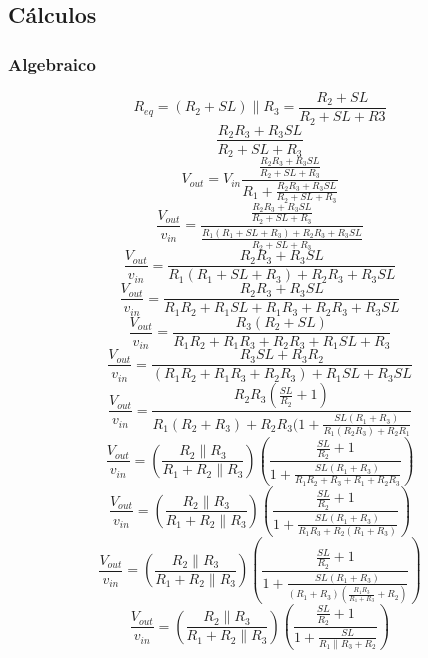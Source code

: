 \documentclass[12pt]{report}
\begin{document}
\subsection{Cálculos}
\subsubsection{Algebraico}
\begin{equation*}
R_{eq}=(R_2+SL)\parallel R_3=\frac{R_2+SL}{R_2+SL+R3}
\end{equation*}
\begin{equation*}
\frac{R_2R_3+R_3SL}{R_2+SL+R_3}
\end{equation*}
\begin{equation*}
V_{out}=V_{in}\frac{\frac{R_2R_3+R_3SL}{R_2+SL+R_3}}{R_1+\frac{R_2R_3+R_3SL}{R_2+SL+R_3}}
\end{equation*}
\begin{equation*}
\frac{V_{out}}{v_{in}}=\frac{\frac{R_2R_3+R_3SL}{R_2+SL+R_3}}{\frac{R_1(R_1+SL+R_3)+R_2R_3+R_3SL}{R_2+SL+R_3}}
\end{equation*}
\begin{equation*}
\frac{V_{out}}{v_{in}}=\frac{R_2R_3+R_3SL}{R_1(R_1+SL+R_3)+R_2R_3+R_3SL}
\end{equation*}
\begin{equation*}
\frac{V_{out}}{v_{in}}=\frac{R_2R_3+R_3SL}{R_1R_2+R_1SL+R_1R_3+R_2R_3+R_3SL}
\end{equation*}
\begin{equation*}
\frac{V_{out}}{v_{in}}=\frac{R_3(R_2+SL)}{R_1R_2+R_1R_3+R_2R_3+R_1SL+R_3}
\end{equation*}
\begin{equation*}
\frac{V_{out}}{v_{in}}=\frac{R_3SL+R_3R_2}{(R_1R_2+R_1R_3+R_2R_3)+R_1SL+R_3SL}
\end{equation*}
\begin{equation*}
\frac{V_{out}}{v_{in}}=\frac{R_2R_3(\frac{SL}{R_2}+1)}{R_1(R_2+R_3)+R_2R_3(1+\frac{SL(R_1+R_3)}{R_1(R_2R_3)+R_2R_1}}
\end{equation*}
\begin{equation*}
\frac{V_{out}}{v_{in}}=(\frac{R_2 \parallel R_3}{R_1+R_2 \parallel R_3})(\frac{\frac{SL}{R_2}+1}{1+\frac{SL(R_1+R_3)}{R_1R_2+R_3+R_1+R_2R_3}})
\end{equation*}
\begin{equation*}
\frac{V_{out}}{v_{in}}=(\frac{R_2 \parallel R_3}{R_1+R_2 \parallel R_3})(\frac{\frac{SL}{R_2}+1}{1+\frac{SL(R_1+R_3)}{R_1R_3+R_2(R_1+R_3)}})
\end{equation*}
\begin{equation*}
\frac{V_{out}}{v_{in}}=(\frac{R_2 \parallel R_3}{R_1+R_2 \parallel R_3})(\frac{\frac{SL}{R_2}+1}{1+\frac{SL(R_1+R_3)}{(R_1+R_3)(\frac{R_1R_3}{R_1+R_3}+R_2)}})
\end{equation*}
\begin{equation*}
\frac{V_{out}}{v_{in}}=(\frac{R_2 \parallel R_3}{R_1+R_2 \parallel R_3})(\frac{\frac{SL}{R_2}+1}{1+\frac{SL}{R_1\parallel R_3+R_2}})
\end{equation*}
\end{document}
